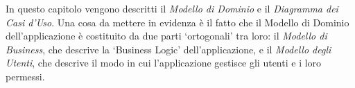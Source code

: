 In questo capitolo vengono descritti il \textsl{Modello di Dominio} e il \textsl{Diagramma dei Casi d'Uso}. Una cosa da mettere in evidenza è il fatto che il Modello di Dominio dell'applicazione è costituito da due parti \textquoteleft ortogonali' tra loro: il \textsl{Modello di Business}, che descrive la \textquoteleft Business Logic' dell'applicazione, e il \textsl{Modello degli Utenti}, che descrive il modo in cui l'applicazione gestisce gli utenti e i loro permessi.